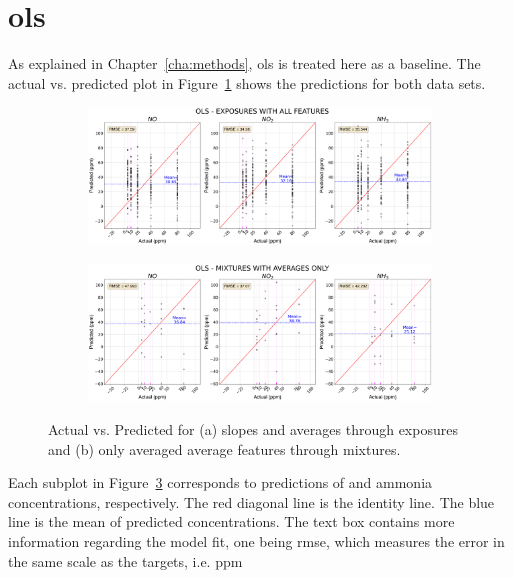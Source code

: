 \section{\acrlong{ols}}
\label{sec:results-ols}

As explained in Chapter~\ref{cha:methods}, \acrshort{ols} is treated here as a baseline. The actual vs. predicted plot in Figure~\ref{fig:ols-exposures} shows the predictions for both data sets.

\begin{figure}[!htb]
	\centering
	
	\begin{subfigure}[b]{1\textwidth}
		\includegraphics[width=1\linewidth]{../figures/ols-act-vs-pred.png}
		\caption{}
		\label{fig:ols-exposures} 
	\end{subfigure}
	
	\begin{subfigure}[b]{1\textwidth}
		\includegraphics[width=1\linewidth]{../figures/ols-avg-act-vs-pred.png}
		\caption{}
		\label{fig:ols-averaged}
	\end{subfigure}
	
	\caption{Actual vs. Predicted for (a) slopes and averages through exposures and (b) only averaged average features through mixtures.}
	\label{fig:ols-both}
\end{figure}

Each subplot  in Figure~\ref{fig:ols-both} corresponds to predictions of \nox and ammonia concentrations, respectively. The red diagonal line is the  identity line. The blue line is the mean of predicted concentrations. The text box contains more information regarding the model fit, one being \acrshort{rmse}, which measures the error in the same scale as the targets, i.e. \acrshort{ppm} 

